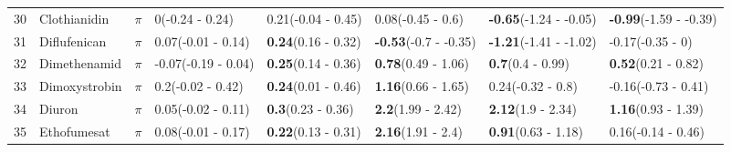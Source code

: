 \begin{longtable}{lp{2cm}p{0.7cm}p{2cm}p{2cm}p{2cm}p{2cm}p{2cm}}
  30 & Clothianidin & $\pi$ & 0\newline (-0.24 - 0.24) & 0.21\newline (-0.04 - 0.45) & 0.08\newline (-0.45 - 0.6) & \textbf{-0.65}\newline (-1.24 - -0.05) & \textbf{-0.99}\newline (-1.59 - -0.39) \\ 
  31 & Diflufenican & $\pi$ & 0.07\newline (-0.01 - 0.14) & \textbf{0.24}\newline (0.16 - 0.32) & \textbf{-0.53}\newline (-0.7 - -0.35) & \textbf{-1.21}\newline (-1.41 - -1.02) & -0.17\newline (-0.35 - 0) \\ 
  32 & Dimethenamid & $\pi$ & -0.07\newline (-0.19 - 0.04) & \textbf{0.25}\newline (0.14 - 0.36) & \textbf{0.78}\newline (0.49 - 1.06) & \textbf{0.7}\newline (0.4 - 0.99) & \textbf{0.52}\newline (0.21 - 0.82) \\ 
  33 & Dimoxystrobin & $\pi$ & 0.2\newline (-0.02 - 0.42) & \textbf{0.24}\newline (0.01 - 0.46) & \textbf{1.16}\newline (0.66 - 1.65) & 0.24\newline (-0.32 - 0.8) & -0.16\newline (-0.73 - 0.41) \\ 
  34 & Diuron & $\pi$ & 0.05\newline (-0.02 - 0.11) & \textbf{0.3}\newline (0.23 - 0.36) & \textbf{2.2}\newline (1.99 - 2.42) & \textbf{2.12}\newline (1.9 - 2.34) & \textbf{1.16}\newline (0.93 - 1.39) \\ 
  35 & Ethofumesat & $\pi$ & 0.08\newline (-0.01 - 0.17) & \textbf{0.22}\newline (0.13 - 0.31) & \textbf{2.16}\newline (1.91 - 2.4) & \textbf{0.91}\newline (0.63 - 1.18) & 0.16\newline (-0.14 - 0.46) \\ 

\end{longtable}

